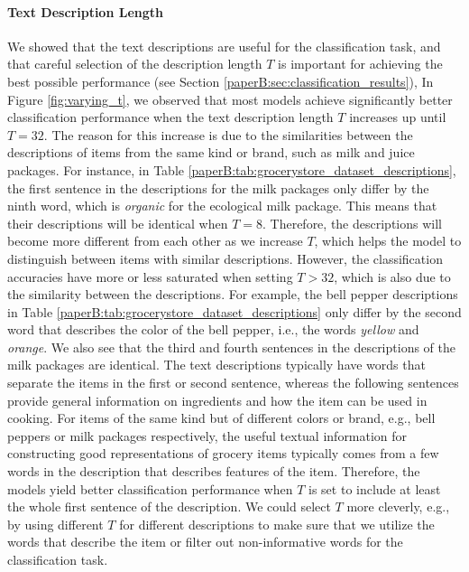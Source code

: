 \vspace{-3mm}
\paragraph{Text Description Length} We showed 
that the text descriptions are useful for the classification task, and that careful selection of the description length $T$ is important for achieving the best possible performance (see Section \ref{paperB:sec:classification_results}), %
In Figure \ref{fig:varying_t}, we observed that most models achieve significantly better classification performance when the text description length $T$ increases up until $T=32$. The reason for this increase is due to the similarities between the descriptions of items from the same kind or brand, such as milk and juice packages. 
For instance, in Table \ref{paperB:tab:grocerystore_dataset_descriptions}, %
the first sentence in the descriptions for the milk packages only differ by the ninth word, which is \textit{organic} for the ecological milk package. 
This means that their descriptions will be identical when $T=8$. Therefore, the descriptions will become more different from each other as we increase $T$, which helps the model to distinguish between items with similar descriptions. However, the classification accuracies have more or less saturated when setting $T > 32$, which is also due to the similarity between the descriptions. For example, the bell pepper descriptions in Table \ref{paperB:tab:grocerystore_dataset_descriptions} %
only differ by the second word that describes the color of the bell pepper, i.e., the words \textit{yellow} and \textit{orange}. We also see that the third and fourth sentences in the descriptions of the milk packages are identical. The text descriptions typically have words that separate the items in the first or second sentence, whereas the following sentences provide general information on ingredients and how the item can be used in cooking. For items of the same kind but of different colors or brand, e.g., bell peppers or milk packages respectively, the useful textual information for constructing good representations of grocery items typically comes from a few words in the description that describes features of the item. Therefore, the models yield better classification performance when $T$ is set to include at least the whole first sentence of the description. We could select $T$ more cleverly, e.g., by using different $T$ for different descriptions to make sure that we utilize the words that describe the item or filter out non-informative words for the classification task. 


